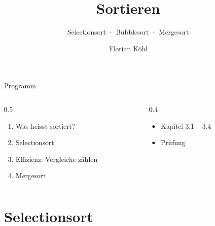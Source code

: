 \documentclass[aspectratio=169,12pt,xcolor={dvipsnames}]{beamer}
\title{Sortieren}
\subtitle{Selectionsort · Bubblesort · Mergesort}
\author{Florian Köhl}
\begin{document}
{\begin{frame}[plain]\titlepage\end{frame}}

\begin{frame}{Programm}
  \begin{columns}[T]
    \begin{column}{0.5\textwidth}
      \begin{enumerate}
        \item Was heisst sortiert?
        \item Selectionsort
        \item Effizienz: Vergleiche zählen
        \item Mergesort
      \end{enumerate}
    \end{column}
    \begin{column}{0.4\textwidth}
      \begin{itemize}\item Kapitel 3.1 – 3.4\end{itemize}
      \vspace{5mm}
      \begin{itemize}\item Prüfung\end{itemize}
    \end{column}
  \end{columns}
\end{frame}

\section{Selectionsort}
\end{document}
